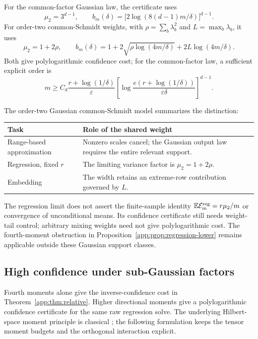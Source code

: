 \documentclass[11pt,a4paper]{article}
\theoremstyle{definition}\newtheorem{definition}[theorem]{Definition}
\theoremstyle{remark}\newtheorem{remark}[theorem]{Remark}
\numberwithin{equation}{section}
\begin{document}
For the common-factor Gaussian law, the certificate uses
\[
 \mu_2=3^{d-1},\qquad
 b_m(\delta)=\bigl[2\log(8(d-1)m/\delta)\bigr]^{d-1}.
\]
For order-two common-Schmidt weights, with
$\rho=\sum_b\lambda_b^2$ and $L=\max_b\lambda_b$, it uses
\[
 \mu_2=1+2\rho,\qquad
 b_m(\delta)=1+2\sqrt{\rho\log(4m/\delta)}+2L\log(4m/\delta).
\]
Both give polylogarithmic confidence cost; for the common-factor law,
a sufficient explicit order is
\[
 m\ge C_d\frac{r+\log(1/\delta)}{\varepsilon}
 \left[\log\frac{e(r+\log(1/\delta))}{\varepsilon\delta}\right]^{d-1}.
\]

The order-two Gaussian common-Schmidt model summarizes the distinction:
\begin{center}\small
\begin{tabularx}{\linewidth}{@{}lY@{}}
\toprule Task & Role of the shared weight\\\midrule
Range-based approximation & Nonzero scales cancel; the Gaussian output law
requires the entire relevant support.\\
Regression, fixed $r$ & The limiting variance factor is $\mu_2=1+2\rho$.\\
Embedding & The width retains an extreme-row contribution governed by $L$.\\
\bottomrule
\end{tabularx}
\end{center}
The regression limit does not assert the finite-sample identity
$\mathbb E\mathcal E_m^{\rm reg}=r\mu_2/m$ or convergence of unconditional means.
Its confidence certificate still needs weight-tail control; arbitrary
mixing weights need not give polylogarithmic cost. The fourth-moment
obstruction in Proposition~\ref{app:prop:regression-lower} remains
applicable outside these Gaussian support classes.

\subsection{High confidence under sub-Gaussian factors}
\label{app:sec:subgauss-confidence}

Fourth moments alone give the inverse-confidence cost in
Theorem~\ref{app:thm:relative}. Higher directional moments give a
polylogarithmic confidence certificate for the same raw regression solve.
The underlying Hilbert-space moment principle is classical
\cite{Pinelis1994,Latala1997}; the following formulation keeps the
tensor moment budgets and the orthogonal interaction explicit.
\end{document}
